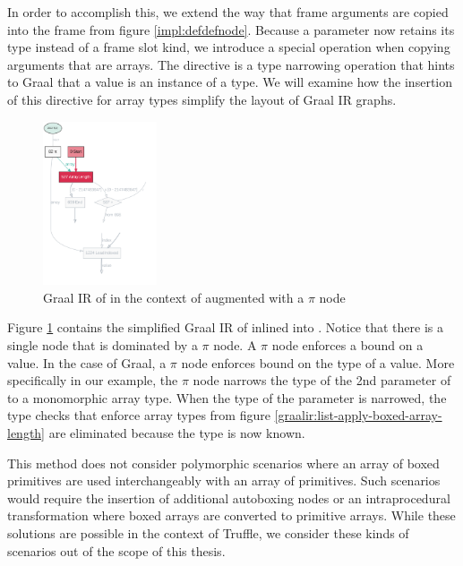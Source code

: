 In order to accomplish this, we extend the way that frame arguments are copied into the frame from figure \ref{impl:defdefnode}.
Because a parameter now retains its type instead of a frame slot kind, we introduce a special operation when copying arguments that are arrays. 
The  directive is a type narrowing operation that hints to Graal that a value is an instance of a type.
We will examine how the insertion of this directive for array types simplify the layout of Graal IR graphs.

\begin{figure}[!htb]
	\centering
	\includegraphics[width=0.3\textwidth]{figures/dot/List.apply.specialized.array_length.png}
	\caption{Graal IR of  in the context of  augmented with a $\pi$ node}
	\label{graalir:list-apply-specialized-array-length}
\end{figure}

Figure \ref{graalir:list-apply-specialized-array-length} contains the simplified Graal IR of  inlined into .
Notice that there is a single  node that is dominated by a $\pi$ node.
A $\pi$ node\cite{abdc:pi-nodes} enforces a bound on a value.
In the case of Graal, a $\pi$ node enforces bound on the type of a value.
More specifically in our example, the $\pi$ node narrows the type of the 2nd parameter of  to a monomorphic array type.
When the type of the parameter is narrowed, the type checks that enforce array types from figure \ref{graalir:list-apply-boxed-array-length} are eliminated because the type is now known.

This method does not consider polymorphic scenarios where an array of boxed primitives are used interchangeably with an array of primitives.
Such scenarios would require the insertion of additional autoboxing nodes or an intraprocedural transformation where boxed arrays are converted to primitive arrays.
While these solutions are possible in the context of Truffle, we consider these kinds of scenarios out of the scope of this thesis.

